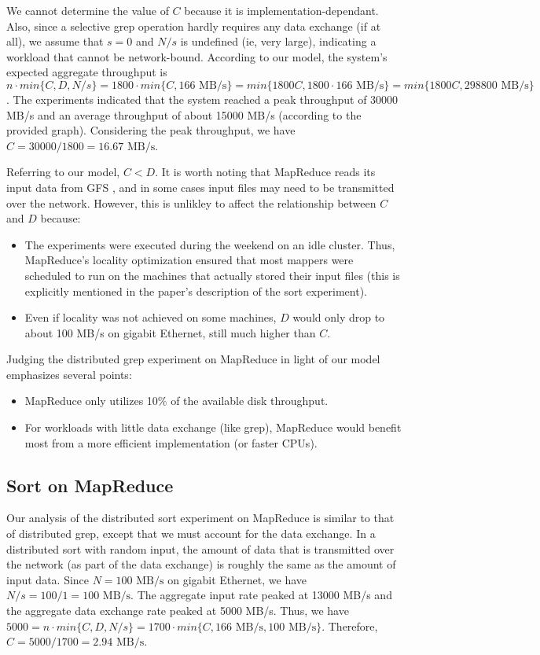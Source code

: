 \documentclass{acm_proc_article-sp}
\begin{document}
We cannot determine the value of $C$ because it is implementation-dependant. Also, since a selective grep operation hardly requires any data exchange (if at all), we assume that $s = 0$ and $N/s$ is undefined (ie, very large), indicating a workload that cannot be network-bound. According to our model, the system's expected aggregate throughput is $n \cdot min\{C, D, N/s\} = 1800 \cdot min\{C, 166 \text{ MB/s}\} = min\{1800C, 1800 \cdot 166 \text{ MB/s}\} = min\{1800C, 298800 \text{ MB/s}\}$. The experiments indicated that the system reached a peak throughput of 30000 MB/s and an average throughput of about 15000 MB/s (according to the provided graph). Considering the peak throughput, we have $C=30000/1800=16.67\text{ MB/s}$. 

Referring to our model, $C < D$. It is worth noting that MapReduce reads its input data from GFS \cite{gfs}, and in some cases input files may need to be transmitted over the network. However, this is unlikley to affect the relationship between $C$ and $D$ because:
\begin{itemize}
  \item The experiments were executed during the weekend on an idle cluster. Thus, MapReduce's locality optimization  ensured that most mappers were scheduled to run on the machines that actually stored their input files (this is explicitly mentioned in the paper's description of the sort experiment).
  \item Even if locality was not achieved on some machines, $D$ would only drop to about 100 MB/s on gigabit Ethernet, still much higher than $C$.
\end{itemize}

Judging the distributed grep experiment on MapReduce in light of our model emphasizes several points:
\begin{itemize}
  \item MapReduce only utilizes 10\% of the available disk throughput.
  \item For workloads with little data exchange (like grep), MapReduce would benefit most from a more efficient implementation (or faster CPUs).
\end{itemize}

\subsection{Sort on MapReduce}
Our analysis of the distributed sort experiment on MapReduce is similar to that of distributed grep, except that we must account for the data exchange. In a distributed sort with random input, the amount of data that is transmitted over the network (as part of the data exchange) is roughly the same as the amount of input data. Since $N = 100 \text{ MB/s}$ on gigabit Ethernet, we have $N/s = 100/1 = 100 \text{ MB/s}$. The aggregate input rate peaked at 13000 MB/s and the aggregate data exchange rate peaked at 5000 MB/s. Thus, we have $5000 = n \cdot min\{C, D, N/s\} = 1700 \cdot min\{C, 166 \text{ MB/s}, 100 \text{ MB/s}\}$. Therefore, $C = 5000/1700 = 2.94 \text{ MB/s}$.
\end{document}

